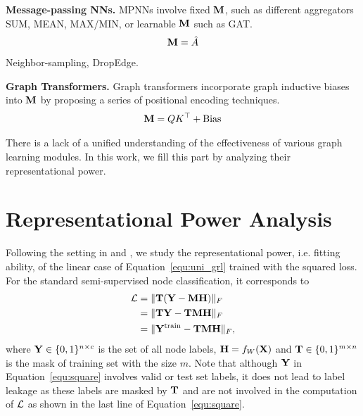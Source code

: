 \documentclass{article} %
\begin{document}
\textbf{Message-passing NNs.}
MPNNs involve fixed ${\mathbf{M}}$, such as different aggregators SUM, MEAN, MAX/MIN, or learnable ${\mathbf{M}}$ such as GAT.
\begin{equation}
	\begin{aligned}
		{\mathbf{M}}=\hat A
	\end{aligned}
\end{equation}
Neighbor-sampling, DropEdge.

\textbf{Graph Transformers.}
Graph transformers incorporate graph inductive biases into ${\mathbf{M}}$ by proposing a series of positional encoding techniques.
\begin{equation}
	\begin{aligned}
		{\mathbf{M}}=QK^{\top}+\textrm{Bias}
	\end{aligned}
\end{equation}

There is a lack of a unified understanding of the effectiveness of various graph learning modules.
In this work, we fill this part by analyzing their representational power.

\section{Representational Power Analysis}


Following the setting in \citet{xu2021optimization} and \citet{JacobiConv}, we study the representational power, i.e. fitting ability, of the linear case of Equation~\ref{equ:uni_grl} trained with the squared loss.
For the standard semi-supervised node classification, it corresponds to
\begin{equation}
	\label{equ:square}
	\begin{aligned}
		{\mathcal{L}}&=\|{\mathbf{T}}({\mathbf{Y}}-{\mathbf{M}}{\mathbf{H}})\|_F\\
		&=\|{\mathbf{T}}{\mathbf{Y}}-{\mathbf{T}}{\mathbf{M}}{\mathbf{H}}\|_F\\
		&=\|{\mathbf{Y}}^{\textrm{train}}-{\mathbf{T}}{\mathbf{M}}{\mathbf{H}}\|_F,
	\end{aligned}
\end{equation}
where ${\mathbf{Y}}\in\{0,1\}^{n\times c}$ is the set of all node labels, ${\mathbf{H}}=f_W({\mathbf{X}})$ and ${\mathbf{T}}\in\{0,1\}^{m\times n}$ is the mask of training set with the size $m$.
Note that although ${\mathbf{Y}}$ in Equation~\ref{equ:square} involves valid or test set labels, it does not lead to label leakage as these labels are masked by ${\mathbf{T}}$ and are not involved in the computation of ${\mathcal{L}}$ as shown in the last line of Equation~\ref{equ:square}.
\end{document}
